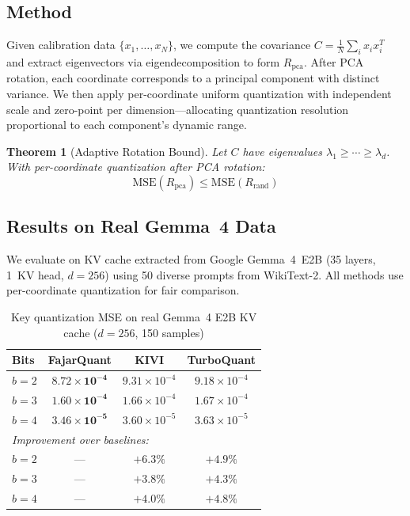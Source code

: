 \documentclass{article}
\newtheorem{theorem}{Theorem}
\begin{document}
\subsection{Method}

Given calibration data $\{x_1, \ldots, x_N\}$, we compute the covariance $C = \frac{1}{N} \sum_i x_i x_i^T$ and extract eigenvectors via eigendecomposition to form $R_{\text{pca}}$. After PCA rotation, each coordinate corresponds to a principal component with distinct variance. We then apply per-coordinate uniform quantization with independent scale and zero-point per dimension---allocating quantization resolution proportional to each component's dynamic range.

\begin{theorem}[Adaptive Rotation Bound]
Let $C$ have eigenvalues $\lambda_1 \geq \cdots \geq \lambda_d$. With per-coordinate quantization after PCA rotation:
\begin{equation}
\text{MSE}(R_{\text{pca}}) \leq \text{MSE}(R_{\text{rand}})
\end{equation}
\end{theorem}

\subsection{Results on Real Gemma~4 Data}

We evaluate on KV cache extracted from Google Gemma~4~E2B (35 layers, 1~KV head, $d{=}256$) using 50 diverse prompts from WikiText-2. All methods use per-coordinate quantization for fair comparison.

\begin{table}[t]
\centering
\small
\caption{Key quantization MSE on real Gemma~4 E2B KV cache ($d{=}256$, 150 samples)}
\label{tab:mse_real}
\begin{tabular}{lccc}
\toprule
Bits & FajarQuant & KIVI & TurboQuant \\
\midrule
$b{=}2$ & $\mathbf{8.72 \times 10^{-4}}$ & $9.31 \times 10^{-4}$ & $9.18 \times 10^{-4}$ \\
$b{=}3$ & $\mathbf{1.60 \times 10^{-4}}$ & $1.66 \times 10^{-4}$ & $1.67 \times 10^{-4}$ \\
$b{=}4$ & $\mathbf{3.46 \times 10^{-5}}$ & $3.60 \times 10^{-5}$ & $3.63 \times 10^{-5}$ \\
\midrule
\multicolumn{4}{l}{\textit{Improvement over baselines:}} \\
$b{=}2$ & --- & $+6.3\%$ & $+4.9\%$ \\
$b{=}3$ & --- & $+3.8\%$ & $+4.3\%$ \\
$b{=}4$ & --- & $+4.0\%$ & $+4.8\%$ \\
\bottomrule
\end{tabular}
\end{table}
\end{document}
